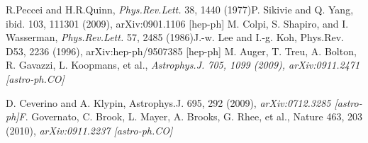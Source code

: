 \documentclass[%
 twocolumn,
 amsmath,amssymb,
 aps,
]{revtex4-2}
\begin{document}
 
\begin{thebibliography}{}
 R.Peccei and H.R.Quinn, \textit{Phys.Rev.Lett.} 38, 1440
(1977)P. Sikivie and Q. Yang, ibid. 103, 111301 (2009),
arXiv:0901.1106 [hep-ph]
 M. Colpi, S. Shapiro, and I. Wasserman, \textit{Phys.Rev.Lett.}
57, 2485 (1986)J.-w. Lee and I.-g. Koh, Phys.Rev. D53,
2236 (1996), arXiv:hep-ph/9507385 [hep-ph]
 M. Auger, T. Treu, A. Bolton, R. Gavazzi, L. Koopmans,
et al., \textit{Astrophys.J. 705, 1099 (2009), arXiv:0911.2471
[astro-ph.CO]}

D. Ceverino and A. Klypin, Astrophys.J. 695, 292 (2009),
\textit{arXiv:0712.3285 [astro-ph]F}. Governato, C. Brook,
L. Mayer, A. Brooks, G. Rhee, et al., Nature 463, 203
(2010), \textit{arXiv:0911.2237 [astro-ph.CO]
}


\end{thebibliography}
\end{document}

